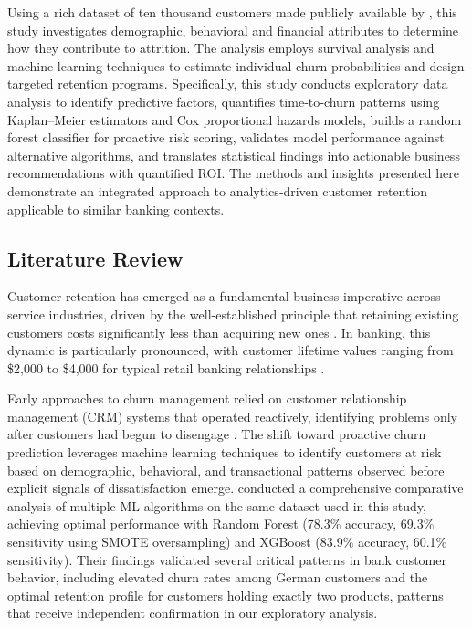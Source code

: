 \documentclass[12pt]{article}
\begin{document}
Using a rich dataset of ten thousand customers made publicly available by \citet{kollipara2022bank}, this study investigates demographic, behavioral and financial attributes to determine how they contribute to attrition. The analysis employs survival analysis and machine learning techniques to estimate individual churn probabilities and design targeted retention programs. Specifically, this study conducts exploratory data analysis to identify predictive factors, quantifies time‑to‑churn patterns using Kaplan–Meier estimators and Cox proportional hazards models, builds a random forest classifier for proactive risk scoring, validates model performance against alternative algorithms, and translates statistical findings into actionable business recommendations with quantified ROI. The methods and insights presented here demonstrate an integrated approach to analytics‑driven customer retention applicable to similar banking contexts.

\subsection{Literature Review}
Customer retention has emerged as a fundamental business imperative across service industries, driven by the well-established principle that retaining existing customers costs significantly less than acquiring new ones \citep{businessbuilders2024cost}. In banking, this dynamic is particularly pronounced, with customer lifetime values ranging from \$2,000 to \$4,000 for typical retail banking relationships \citep{meleis2010clv}.

Early approaches to churn management relied on customer relationship management (CRM) systems that operated reactively, identifying problems only after customers had begun to disengage \citep{singh2024productchurn}. The shift toward proactive churn prediction leverages machine learning techniques to identify customers at risk based on demographic, behavioral, and transactional patterns observed before explicit signals of dissatisfaction emerge. \citet{singh2024productchurn} conducted a comprehensive comparative analysis of multiple ML algorithms on the same dataset used in this study, achieving optimal performance with Random Forest (78.3\% accuracy, 69.3\% sensitivity using SMOTE oversampling) and XGBoost (83.9\% accuracy, 60.1\% sensitivity). Their findings validated several critical patterns in bank customer behavior, including elevated churn rates among German customers and the optimal retention profile for customers holding exactly two products, patterns that receive independent confirmation in our exploratory analysis.
\end{document}
